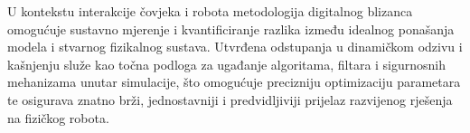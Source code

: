U kontekstu interakcije čovjeka i robota metodologija digitalnog blizanca omogućuje sustavno mjerenje i kvantificiranje razlika između idealnog ponašanja modela i stvarnog fizikalnog sustava. Utvrđena odstupanja u dinamičkom odzivu i kašnjenju služe kao točna podloga za ugađanje algoritama, filtara i sigurnosnih mehanizama unutar simulacije, što omogućuje precizniju optimizaciju parametara te osigurava znatno brži, jednostavniji i predvidljiviji prijelaz razvijenog rješenja na fizičkog robota.

\FloatBarrier
